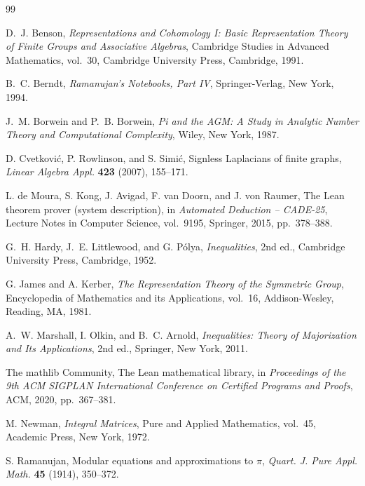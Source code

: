 \documentclass[11pt]{amsart}
\theoremstyle{definition}
\theoremstyle{remark}
\begin{document}
\begin{thebibliography}{99}

D.~J. Benson,
\emph{Representations and Cohomology I: Basic Representation Theory of Finite Groups and Associative Algebras},
Cambridge Studies in Advanced Mathematics, vol.~30, Cambridge University Press, Cambridge, 1991.

B.~C. Berndt,
\emph{Ramanujan's Notebooks, Part IV},
Springer-Verlag, New York, 1994.

J.~M. Borwein and P.~B. Borwein,
\emph{Pi and the AGM: A Study in Analytic Number Theory and Computational Complexity},
Wiley, New York, 1987.

D. Cvetkovi\'c, P. Rowlinson, and S. Simi\'c,
Signless Laplacians of finite graphs,
\emph{Linear Algebra Appl.} \textbf{423} (2007), 155--171.

L. de Moura, S. Kong, J. Avigad, F. van Doorn, and J. von Raumer,
The Lean theorem prover (system description),
in \emph{Automated Deduction -- CADE-25}, Lecture Notes in Computer Science, vol.~9195, Springer, 2015, pp.~378--388.

G.~H. Hardy, J.~E. Littlewood, and G. P\'olya,
\emph{Inequalities}, 2nd ed., Cambridge University Press, Cambridge, 1952.

G. James and A. Kerber,
\emph{The Representation Theory of the Symmetric Group},
Encyclopedia of Mathematics and its Applications, vol.~16, Addison-Wesley, Reading, MA, 1981.

A.~W. Marshall, I. Olkin, and B.~C. Arnold,
\emph{Inequalities: Theory of Majorization and Its Applications}, 2nd ed.,
Springer, New York, 2011.

The mathlib Community,
The Lean mathematical library,
in \emph{Proceedings of the 9th ACM SIGPLAN International Conference on Certified Programs and Proofs}, ACM, 2020, pp.~367--381.

M. Newman,
\emph{Integral Matrices},
Pure and Applied Mathematics, vol.~45, Academic Press, New York, 1972.

S. Ramanujan,
Modular equations and approximations to $\pi$,
\emph{Quart. J. Pure Appl. Math.} \textbf{45} (1914), 350--372.

\end{thebibliography}
\end{document}
